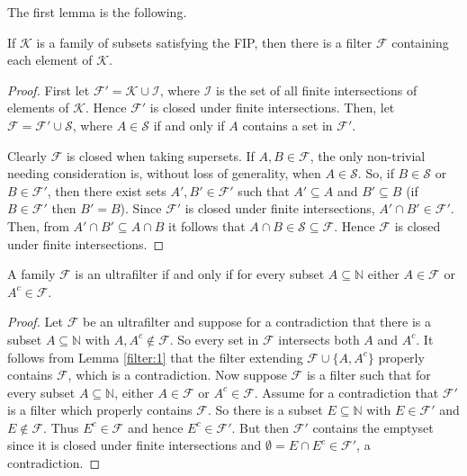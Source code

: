 The first lemma is the following.
\begin{lemma}
\label{filter:1}
 If \( \mathcal{K}  \) is a family of subsets satisfying the FIP, then there is a filter \(  \mathcal{F}  \) containing each element of \( \mathcal{K}  \).
\end{lemma}
\begin{proof}
	First let \( \mathcal{F}' = \mathcal{K} \cup \mathcal{I}  \), where \( \mathcal{I}  \) is the set of all finite intersections of elements of \( \mathcal{K}  \). Hence \( \mathcal{F} ' \) is closed under finite intersections. Then, let \( \mathcal{F} = \mathcal{F}' \cup \mathcal{S}  \), where \( A \in \mathcal{S}  \) if and only if \( A \) contains a set in \( \mathcal{F} ' \).

	Clearly \( \mathcal{F}  \) is closed when taking supersets. If \( A, B \in \mathcal{F}  \), the only non-trivial needing consideration is, without loss of generality, when \( A \in \mathcal{S}  \). So, if \( B \in \mathcal{S}  \) or \( B \in \mathcal{F} ' \), then there exist sets \( A', B' \in \mathcal{F}'  \) such that \( A' \subseteq A \) and \( B' \subseteq B \) (if \( B \in \mathcal{F} ' \) then \( B' = B \)). Since \( \mathcal{F} ' \) is closed under finite intersections, \( A' \cap B' \in \mathcal{F} ' \). Then, from \( A' \cap B' \subseteq A \cap B \) it follows that \( A \cap B \in \mathcal{S} \subseteq \mathcal{F}  \). Hence \( \mathcal{F}  \) is closed under finite intersections.
\end{proof}
\begin{lemma}
\label{filter:2}
A family \( \mathcal{F}  \) is an ultrafilter if and only if for every subset \( A \subseteq \mathbb{N}  \) either \( A \in \mathcal{F}  \) or \( A^{c} \in \mathcal{F}  \).
\end{lemma}
\begin{proof}
Let \( \mathcal{F}  \) be an ultrafilter and suppose for a contradiction that there is a subset \( A \subseteq \mathbb{N}  \) with \( A, A^{c} \notin \mathcal{F}  \). So every set in \( \mathcal{F}  \) intersects both \( A \) and \( A^{c}  \). It follows from Lemma \ref{filter:1} that the filter extending \( \mathcal{F} \cup \{ A, A^{c}  \}  \) properly contains \( \mathcal{F}  \), which is a contradiction. Now suppose \( \mathcal{F}  \) is a filter such that for every subset \( A \subseteq \mathbb{N}  \), either \( A \in \mathcal{F}  \) or \( A^{c} \in \mathcal{F}  \). Assume for a contradiction that \( \mathcal{F} ' \) is a filter which properly contains \( \mathcal{F}  \). So there is a subset \( E \subseteq \mathbb{N}  \) with \( E \in \mathcal{F} ' \) and \( E \notin \mathcal{F}  \). Thus \( E^{c} \in \mathcal{F}  \) and hence \( E^{c} \in \mathcal{F} ' \). But then \( \mathcal{F} ' \) contains the emptyset since it is closed under finite intersections and \( \emptyset = E \cap E^{c} \in \mathcal{F} ' \), a contradiction.
\end{proof}
